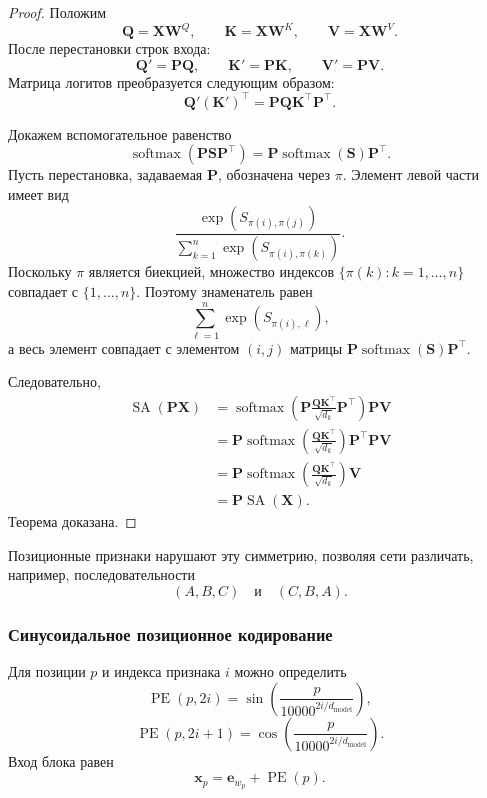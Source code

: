 \documentclass[12pt,a4paper]{article}
\theoremstyle{definition}
\newcommand{\softmax}{\operatorname{softmax}}
\newcommand{\1}{\mathbf{1}}
\begin{document}
\begin{proof}
Положим
\[
    \bm{Q}=\bm{X}\bm{W}^Q,\qquad
    \bm{K}=\bm{X}\bm{W}^K,\qquad
    \bm{V}=\bm{X}\bm{W}^V.
\]
После перестановки строк входа:
\[
    \bm{Q}'=\bm{P}\bm{Q},\qquad
    \bm{K}'=\bm{P}\bm{K},\qquad
    \bm{V}'=\bm{P}\bm{V}.
\]
Матрица логитов преобразуется следующим образом:
\[
    \bm{Q}'(\bm{K}')^\top
    =
    \bm{P}\bm{Q}\bm{K}^\top\bm{P}^\top.
\]

Докажем вспомогательное равенство
\[
    \softmax(\bm{P}\bm{S}\bm{P}^\top)
    =
    \bm{P}\softmax(\bm{S})\bm{P}^\top.
\]
Пусть перестановка, задаваемая $\bm{P}$, обозначена через $\pi$.
Элемент левой части имеет вид
\[
    \frac{
        \exp(S_{\pi(i),\pi(j)})
    }{
        \sum_{k=1}^{n}\exp(S_{\pi(i),\pi(k)})
    }.
\]
Поскольку $\pi$ является биекцией, множество индексов
$\{\pi(k):k=1,\ldots,n\}$ совпадает с $\{1,\ldots,n\}$. Поэтому
знаменатель равен
\[
    \sum_{\ell=1}^{n}\exp(S_{\pi(i),\ell}),
\]
а весь элемент совпадает с элементом
$(i,j)$ матрицы
$\bm{P}\softmax(\bm{S})\bm{P}^\top$.

Следовательно,
\begin{align*}
    \operatorname{SA}(\bm{P}\bm{X})
    &=
    \softmax\left(
        \bm{P}
        \frac{\bm{Q}\bm{K}^\top}{\sqrt{d_k}}
        \bm{P}^\top
    \right)\bm{P}\bm{V}\\
    &=
    \bm{P}
    \softmax\left(
        \frac{\bm{Q}\bm{K}^\top}{\sqrt{d_k}}
    \right)
    \bm{P}^\top\bm{P}\bm{V}\\
    &=
    \bm{P}
    \softmax\left(
        \frac{\bm{Q}\bm{K}^\top}{\sqrt{d_k}}
    \right)\bm{V}\\
    &=
    \bm{P}\operatorname{SA}(\bm{X}).
\end{align*}
Теорема доказана.
\end{proof}

Позиционные признаки нарушают эту симметрию, позволяя сети различать,
например, последовательности
\[
    (A,B,C)
    \quad\text{и}\quad
    (C,B,A).
\]

\subsubsection{Синусоидальное позиционное кодирование}

Для позиции $p$ и индекса признака $i$ можно определить
\[
    \operatorname{PE}(p,2i)
    =
    \sin\left(
        \frac{p}{10000^{2i/d_{\text{model}}}}
    \right),
\]
\[
    \operatorname{PE}(p,2i+1)
    =
    \cos\left(
        \frac{p}{10000^{2i/d_{\text{model}}}}
    \right).
\]
Вход блока равен
\[
    \bm{x}_p=\bm{e}_{w_p}+\operatorname{PE}(p).
\]
\end{document}

